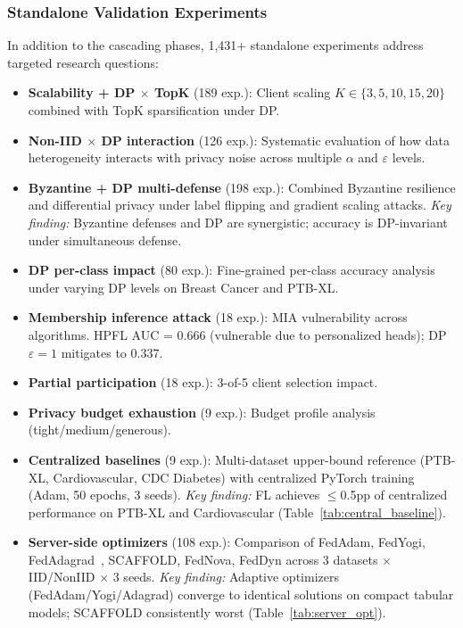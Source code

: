 \documentclass[conference]{IEEEtran}
\begin{document}
\subsubsection{Standalone Validation Experiments}

In addition to the cascading phases, 1,431+ standalone experiments address targeted research questions:

\begin{itemize}
    \item \textbf{Scalability + DP $\times$ TopK} (189 exp.): Client scaling $K{\in}\{3, 5, 10, 15, 20\}$ combined with TopK sparsification under DP.
    \item \textbf{Non-IID $\times$ DP interaction} (126 exp.): Systematic evaluation of how data heterogeneity interacts with privacy noise across multiple $\alpha$ and $\varepsilon$ levels.
    \item \textbf{Byzantine + DP multi-defense} (198 exp.): Combined Byzantine resilience and differential privacy under label flipping and gradient scaling attacks. \textit{Key finding:} Byzantine defenses and DP are synergistic; accuracy is DP-invariant under simultaneous defense.
    \item \textbf{DP per-class impact} (80 exp.): Fine-grained per-class accuracy analysis under varying DP levels on Breast Cancer and PTB-XL.
    \item \textbf{Membership inference attack} (18 exp.): MIA vulnerability across algorithms. HPFL AUC = 0.666 (vulnerable due to personalized heads); DP $\varepsilon{=}1$ mitigates to 0.337.
    \item \textbf{Partial participation} (18 exp.): 3-of-5 client selection impact.
    \item \textbf{Privacy budget exhaustion} (9 exp.): Budget profile analysis (tight/medium/generous).
    \item \textbf{Centralized baselines} (9 exp.): Multi-dataset upper-bound reference (PTB-XL, Cardiovascular, CDC Diabetes) with centralized PyTorch training (Adam, 50 epochs, 3 seeds). \textit{Key finding:} FL achieves $\leq$0.5pp of centralized performance on PTB-XL and Cardiovascular (Table~\ref{tab:central_baseline}).
    \item \textbf{Server-side optimizers} (108 exp.): Comparison of FedAdam, FedYogi, FedAdagrad~\cite{reddi2021adaptive}, SCAFFOLD, FedNova, FedDyn across 3 datasets $\times$ IID/NonIID $\times$ 3 seeds. \textit{Key finding:} Adaptive optimizers (FedAdam/Yogi/Adagrad) converge to identical solutions on compact tabular models; SCAFFOLD consistently worst (Table~\ref{tab:server_opt}).

\end{itemize}
\end{document}
